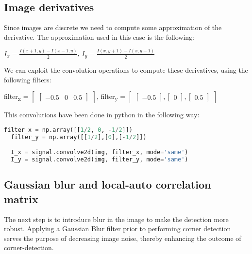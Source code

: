 \documentclass{ETHExercise}
\begin{document}
\subsection{Image derivatives}

Since images are discrete we need to compute some approximation of the derivative.
The approximation used in this case is the following:
\begin{center}
  $I_x = \frac{I(x+1, y)- I(x-1, y)}{2}$, $I_y = \frac{I(x, y+1)- I(x, y-1)}{2}$
\end{center}
We can exploit the convolution operations to compute these derivatives, 
using the following filters:
\begin{center}
  filter\textsubscript{x} = $\begin{bmatrix}
    \begin{bmatrix}
      -0.5 & 0 & 0.5
    \end{bmatrix}
  \end{bmatrix}
  $, filter\textsubscript{y} = $\begin{bmatrix}
    \begin{bmatrix}
      -0.5 
    \end{bmatrix},
    \begin{bmatrix}
     0 
    \end{bmatrix},
    \begin{bmatrix}
    0.5
    \end{bmatrix}
  \end{bmatrix}
  $
\end{center}
This convolutions have been done in python in the following way:
\begin{lstlisting}[language=Python, caption=Image gradients]
  filter_x = np.array([[1/2, 0, -1/2]])
  filter_y = np.array([[1/2],[0],[-1/2]])

  I_x = signal.convolve2d(img, filter_x, mode='same')
  I_y = signal.convolve2d(img, filter_y, mode='same')
\end{lstlisting}

\subsection{Gaussian blur and local-auto correlation matrix}

The next step is to introduce blur in the image to make the detection 
more robust. Applying a Gaussian Blur filter prior to performing corner 
detection serves the purpose of decreasing image noise, thereby enhancing 
the outcome of corner-detection. 
\end{document}
